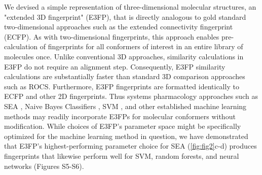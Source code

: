 \documentclass[../main.tex]{subfiles}
\begin{document}
\begin{refsection}
We devised a simple representation of three-dimensional molecular structures, an "extended 3D fingerprint" (E3FP), that is directly analogous to gold standard two-dimensional approaches such as the extended connectivity fingerprint (ECFP).
As with two-dimensional fingerprints, this approach enables pre-calculation of fingerprints for all conformers of interest in an entire library of molecules once.
Unlike conventional 3D approaches, similarity calculations in E3FP do not require an alignment step.
Consequently, E3FP similarity calculations are substantially faster than standard 3D comparison approaches such as ROCS.
Furthermore, E3FP fingerprints are formatted identically to ECFP and other 2D fingerprints.
Thus systems pharmacology approaches such as SEA \cite{keiser_2007,keiser_2009}, Naive Bayes Classifiers  \cite{zhang_2004}, SVM \cite{cortes_1995}, and other established machine learning methods may readily incorporate E3FPs for molecular conformers without modification.
While choices of E3FP's parameter space might be specifically optimized for the machine learning method in question, we have demonstrated that E3FP's highest-performing parameter choice for SEA (\cref{fig:fig2}c-d) produces fingerprints that likewise perform well for SVM, random forests, and neural networks (Figures S5-S6).


\end{refsection}
\end{document}
